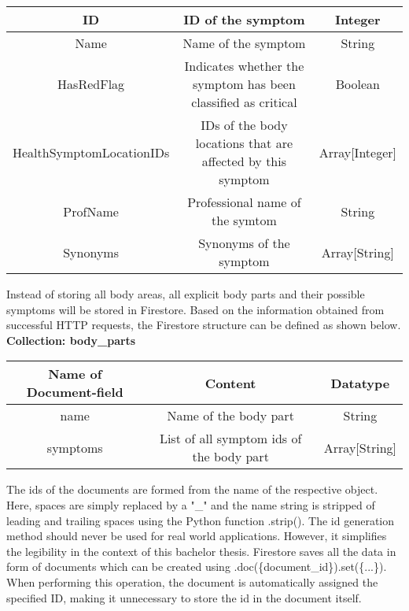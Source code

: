 \begin{itemize}
\begin{center}
\begin{tabular}{ | c| c| c | }
  				\hline
  				ID & ID of the symptom & Integer \\ 
  				\hline
 				Name & Name of the symptom & String \\ 
  				\hline
  				HasRedFlag & Indicates whether the symptom has been classified as critical & Boolean \\ 
  				\hline
  				HealthSymptomLocationIDs & IDs of the body locations that are affected by this symptom & Array[Integer] \\ 
  				\hline
 				ProfName & Professional name of the symtom & String \\
				\hline 			
 				Synonyms & Synonyms of the symptom & Array[String] \\
 				\hline
			\end{tabular}
		\normalsize
		\end{center}

\end{itemize}
Instead of storing all body areas, all explicit body parts and their possible symptoms will be stored in Firestore. Based on the information obtained from successful HTTP requests, the Firestore structure can be defined as shown below.
\newline
\textbf{Collection: body\_parts}
		\begin{center}
			\begin{tabular}{ | c| c| c | } 
  				\hline
  				Name of Document-field& Content & Datatype \\ 
  				\hline
  				name & Name of the body part & String \\ 
  				\hline
 				symptoms & List of all symptom ids of the body part  & Array[String] \\ 
  				\hline
			\end{tabular}
		\end{center}
The ids of the documents are formed from the name of the respective object. Here, spaces are simply replaced by a "\_" and the name string is stripped of leading and trailing spaces using the Python function .strip(). The id generation method should never be used for real world applications. However, it simplifies the legibility in the context of this bachelor thesis. Firestore saves all the data in form of documents which can be created using .doc(\{document\_id\}).set(\{...\}).  When performing this operation, the document is automatically assigned the specified ID, making it unnecessary to store the id in the document itself.

